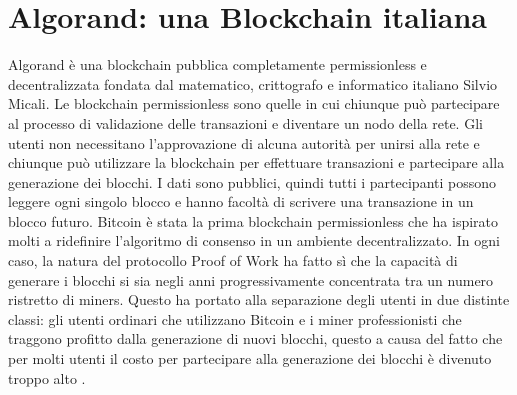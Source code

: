 \section{Algorand: una Blockchain italiana}
Algorand è una blockchain pubblica completamente permissionless e decentralizzata fondata dal matematico, crittografo e informatico italiano Silvio Micali. Le blockchain permissionless sono quelle in cui chiunque può partecipare al processo di validazione delle transazioni e diventare un nodo della rete. Gli utenti non necessitano l'approvazione di alcuna autorità per unirsi alla rete e chiunque può utilizzare la blockchain per effettuare transazioni e partecipare alla generazione dei blocchi. I dati sono pubblici, quindi tutti i partecipanti possono leggere ogni singolo blocco e hanno facoltà di scrivere una transazione in un blocco futuro. Bitcoin è stata la prima blockchain permissionless che ha ispirato molti a ridefinire l'algoritmo di consenso in un ambiente decentralizzato. In ogni caso, la natura del protocollo Proof of Work ha fatto sì che la capacità di generare i blocchi si sia negli anni progressivamente concentrata tra un numero ristretto di miners. Questo ha portato alla separazione degli utenti in due distinte classi: gli utenti ordinari che utilizzano Bitcoin e i miner professionisti che traggono profitto dalla generazione di nuovi blocchi, questo a causa del fatto che per molti utenti il costo per partecipare alla generazione dei blocchi è divenuto troppo alto \cite{algorand2}.

